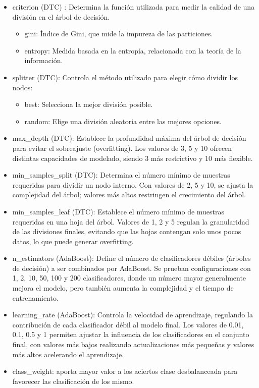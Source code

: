 \documentclass[12pt,letterpaper]{article}
\begin{document}
\begin{itemize}
    \item criterion (DTC) : Determina la función utilizada para medir la calidad de una división en el árbol de decisión. 
     \begin{itemize}
         \item gini: Índice de Gini, que mide la impureza de las particiones. 
         \item entropy: Medida basada en la entropía, relacionada con la teoría de la información.
     \end{itemize}
    \item splitter (DTC): Controla el método utilizado para elegir cómo dividir los nodos:
    \begin{itemize}
        \item best: Selecciona la mejor división posible.
        \item random: Elige una división aleatoria entre las mejores opciones.
    \end{itemize}

    \item max\_depth (DTC): Establece la profundidad máxima del árbol de decisión para evitar el sobreajuste (overfitting). Los valores de 3, 5 y 10 ofrecen distintas capacidades de modelado, siendo 3 más restrictivo y 10 más flexible.

    \item min\_samples\_split (DTC): Determina el número mínimo de muestras requeridas para dividir un nodo interno. Con valores de 2, 5 y 10, se ajusta la complejidad del árbol; valores más altos restringen el crecimiento del árbol.

    \item min\_samples\_leaf (DTC): Establece el número mínimo de muestras requeridas en una hoja del árbol. Valores de 1, 2 y 5 regulan la granularidad de las divisiones finales, evitando que las hojas contengan solo unos pocos datos, lo que puede generar overfitting.

    \item n\_estimators (AdaBoost): Define el número de clasificadores débiles (árboles de decisión) a ser combinados por AdaBoost. Se prueban configuraciones con 1, 2, 10, 50, 100 y 200 clasificadores, donde un número mayor generalmente mejora el modelo, pero también aumenta la complejidad y el tiempo de entrenamiento.

    \item learning\_rate (AdaBoost): Controla la velocidad de aprendizaje, regulando la contribución de cada clasificador débil al modelo final. Los valores de 0.01, 0.1, 0.5 y 1 permiten ajustar la influencia de los clasificadores en el conjunto final, con valores más bajos realizando actualizaciones más pequeñas y valores más altos acelerando el aprendizaje.

    \item class\_weight: aporta mayor valor a los aciertos clase desbalanceada para favorecer las clasificación de los mismo.
    
\end{itemize}
\end{document}
